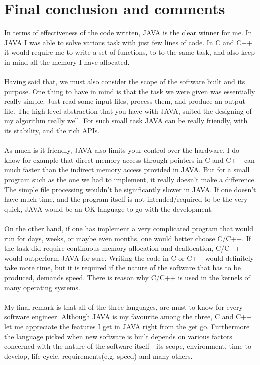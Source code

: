 \documentclass[a4paper]{article}
\begin{document}
\section{Final conclusion and comments}
In terms of effectiveness of the code written, JAVA is the clear winner for me. In JAVA I was able to solve various task with just few lines of code. In C and C++ it would require me to write a set of functions, to to the same task, and also keep in mind all the memory I have allocated. \\\\
 Having said that, we must also consider the scope of the software built and its purpose. One thing to have in mind is that the task we were given was essentially really simple. Just read some input files, process them, and produce an output file. The high level abstraction that you have with JAVA, suited the designing of my algorithm really well. For such small task JAVA can be really friendly, with its stability, and the rich APIs. \\\\
 As much is it friendly, JAVA also limits your control over the hardware. I do know for example that direct memory access through pointers in C and C++ can much faster than the indirect memory access provided in JAVA. But for a small program such as the one we had to implement, it really doesn't make a difference. The simple file processing wouldn't be significantly slower in JAVA. If one doesn't have much time, and the program itself is not intended/required to be the very quick, JAVA would be an OK language to go with the development.\\\\ 
 On the other hand, if one has implement a very complicated program that would run for days, weeks, or maybe even months, one would better choose C/C++. If the task did require continuous memory allocation and deallocation, C/C++ would outperform JAVA for sure. Writing the code in C or C++ would definitely take more time, but it is required if the nature of the software that has to be produced, demands speed. There is reason why C/C++ is used in the kernels of many operating systems. \\\\
 My final remark is that all of the three languages, are must to know for every software engineer. Although JAVA is my favourite among the three, C and C++ let me appreciate the features I get in JAVA right from the get go. Furthermore the language picked when new software is built depends on various factors concerned with the nature of the software itself - its scope, environment, time-to-develop, life cycle, requirements(e.g. speed) and many others.
\end{document}
